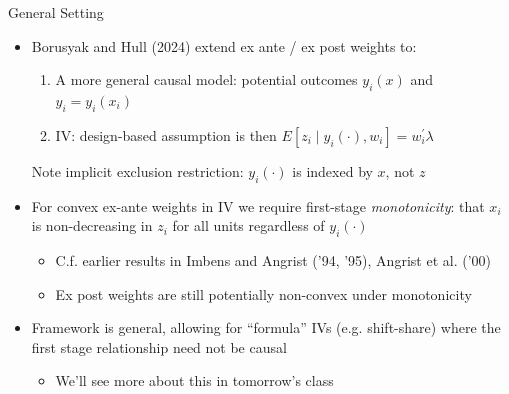 \documentclass[11pt,english]{beamer}
\begin{document}
\begin{frame}{General Setting}
\begin{itemize}
\item Borusyak and Hull (2024) extend ex ante / ex post weights to:\smallskip
\begin{enumerate}
\item A more general causal model: potential outcomes $y_i(x)$ and $y_i=y_i(x_i)$\smallskip
\item IV: design-based assumption is then $E[z_i\mid y_i(\cdot),w_i]=w_i^\prime\lambda$\smallskip
\end{enumerate}
Note implicit exclusion restriction: $y_i(\cdot)$ is indexed by $x$, not $z$\bigskip\pause{}
\item For convex ex-ante weights in IV we require first-stage \emph{monotonicity}: that $x_i$ is non-decreasing in $z_i$ for all units regardless of $y_i(\cdot)$ \smallskip
\begin{itemize}
\item C.f. earlier results in Imbens and Angrist ('94, '95), Angrist et al. ('00)\smallskip\pause{}
\item Ex post weights are still potentially non-convex under monotonicity 
\end{itemize}\bigskip\pause{}
\item Framework is general, allowing for ``formula'' IVs (e.g. shift-share) where the first stage relationship need not be causal \smallskip
\begin{itemize}
\item We'll see more about this in tomorrow's class
\end{itemize}
\end{itemize}
\end{frame}
\end{document}
